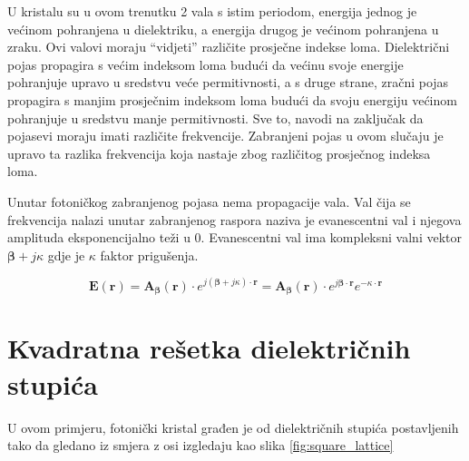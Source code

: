 \documentclass[utf8, seminar, numeric]{fer}
\begin{document}
U kristalu su u ovom trenutku 2 vala s istim periodom, energija jednog je
većinom pohranjena u dielektriku, a energija drugog je većinom pohranjena
u zraku. Ovi valovi moraju ``vidjeti'' različite prosječne indekse loma.
Dielektrični pojas propagira s većim indeksom loma budući da većinu svoje energije
pohranjuje upravo u sredstvu veće permitivnosti, a s druge strane, zračni pojas
propagira s manjim prosječnim indeksom loma budući da svoju energiju
većinom pohranjuje u sredstvu manje permitivnosti. Sve to, navodi na zaključak
da pojasevi moraju imati različite frekvencije. Zabranjeni pojas u ovom
slučaju je upravo ta razlika frekvencija koja nastaje zbog različitog prosječnog
indeksa loma.

\FloatBarrier
Unutar fotoničkog zabranjenog pojasa nema propagacije vala. Val čija se
frekvencija nalazi unutar zabranjenog raspora naziva je evanescentni val i
njegova amplituda eksponencijalno teži u 0. Evanescentni val ima kompleksni valni
vektor ${\bm{\beta}} + j \kappa$ gdje je $\kappa$ faktor prigušenja.

\begin{equation} \label{eq:evan}
	\mathbf{E}(\mathbf{r}) =
	\mathbf{A}_{\bm{\beta}}(\mathbf{r}) \cdot
		e^{j ({\bm{\beta}} + j \kappa) \cdot \mathbf{r}} =
	\mathbf{A}_{\bm{\beta}}(\mathbf{r}) \cdot
		e^{j {\bm{\beta}} \cdot \mathbf{r}} e^{-\kappa \cdot \mathbf{r}}
\end{equation}


\section{Kvadratna rešetka dielektričnih stupića}

U ovom primjeru, fotonički kristal građen je od dielektričnih stupića
postavljenih tako da gledano iz smjera z osi izgledaju kao slika
\ref{fig:square_lattice}
\end{document}
